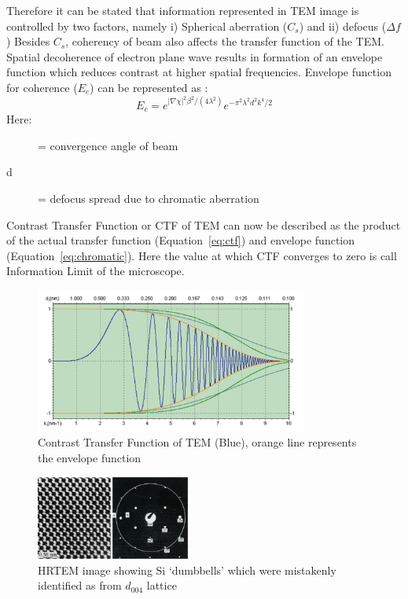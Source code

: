 Therefore it can be stated that information represented in TEM image is controlled by two factors, namely i) Spherical aberration ($C_s$) and ii) defocus ($\Delta f$)
Besides $C_s$, coherency of beam also affects the transfer function of the TEM.
Spatial decoherence of electron plane wave results in formation of an envelope function which reduces contrast at higher spatial frequencies.
Envelope function for coherence ($E_c$) can be represented as :
\begin{equation}
    E_c = e^{|\nabla\chi|^2\beta^2/(4\lambda^2)} e^{-\pi^2\lambda^2d^2 k^4/2}
    \label{eq:chromatic}
\end{equation}
Here:
\begin{description}
    \item[\beta] = convergence angle of beam
    \item[d] = defocus spread due to chromatic aberration 
\end{description}
Contrast Transfer Function or CTF of TEM can now be described as the product of the actual transfer function (Equation~\ref{eq:ctf}) and envelope function (Equation~\ref{eq:chromatic}).
Here the value at which CTF converges to zero is call Information Limit of the microscope.
\begin{figure}[t]
    \centering
    \includegraphics[width=0.8\textwidth]{figures/ctf.pdf}
    \caption{Contrast Transfer Function of TEM (Blue), orange line represents the envelope function}
    \label{fig:ctffigure}
\end{figure}


\begin{figure}
    \centering
        \includegraphics[width=0.45\textwidth]{figures/siwrong.pdf}
        \caption{HRTEM image showing Si `dumbbells' which were mistakenly  identified as from $d_{004}$ lattice}
        \label{fig:siwrong}
\end{figure}


